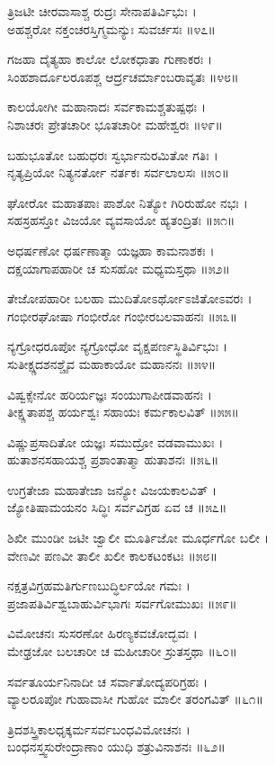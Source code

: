 ತ್ರಿಜಟೀ ಚೀರವಾಸಾಶ್ಚ ರುದ್ರಃ ಸೇನಾಪತಿರ್ವಿಭುಃ ।\\
ಅಹಶ್ಚರೋ ನಕ್ತಂಚರಸ್ತಿಗ್ಮಮನ್ಯುಃ ಸುವರ್ಚಸಃ ॥೪೭॥

ಗಜಹಾ ದೈತ್ಯಹಾ ಕಾಲೋ ಲೋಕಧಾತಾ ಗುಣಾಕರಃ ।\\
ಸಿಂಹಶಾರ್ದೂಲರೂಪಶ್ಚ ಆರ್ದ್ರಚರ್ಮಾಂಬರಾವೃತಃ ॥೪೮॥

ಕಾಲಯೋಗೀ ಮಹಾನಾದಃ ಸರ್ವಕಾಮಶ್ಚತುಷ್ಪಥಃ ।\\
ನಿಶಾಚರಃ ಪ್ರೇತಚಾರೀ ಭೂತಚಾರೀ ಮಹೇಶ್ವರಃ ॥೪೯॥

ಬಹುಭೂತೋ ಬಹುಧರಃ ಸ್ವರ್ಭಾನುರಮಿತೋ ಗತಿಃ ।\\
ನೃತ್ಯಪ್ರಿಯೋ ನಿತ್ಯನರ್ತೋ ನರ್ತಕಃ ಸರ್ವಲಾಲಸಃ ॥೫೦॥

ಘೋರೋ ಮಹಾತಪಾಃ ಪಾಶೋ ನಿತ್ಯೋ ಗಿರಿರುಹೋ ನಭಃ ।\\
ಸಹಸ್ರಹಸ್ತೋ ವಿಜಯೋ ವ್ಯವಸಾಯೋ ಹ್ಯತಂದ್ರಿತಃ ॥೫೧॥

ಅಧರ್ಷಣೋ ಧರ್ಷಣಾತ್ಮಾ ಯಜ್ಞಹಾ ಕಾಮನಾಶಕಃ ।\\
ದಕ್ಷಯಾಗಾಪಹಾರೀ ಚ ಸುಸಹೋ ಮಧ್ಯಮಸ್ತಥಾ ॥೫೨॥

ತೇಜೋಪಹಾರೀ ಬಲಹಾ ಮುದಿತೋಽರ್ಥೋಽಜಿತೋಽವರಃ ।\\
ಗಂಭೀರಘೋಷಾ ಗಂಭೀರೋ ಗಂಭೀರಬಲವಾಹನಃ ॥೫೩॥

ನ್ಯಗ್ರೋಧರೂಪೋ ನ್ಯಗ್ರೋಧೋ ವೃಕ್ಷಪರ್ಣಸ್ಥಿತಿರ್ವಿಭುಃ ।\\
ಸುತೀಕ್ಷ್ಣದಶನಶ್ಚೈವ ಮಹಾಕಾಯೋ ಮಹಾನನಃ ॥೫೪॥

ವಿಷ್ವಕ್ಸೇನೋ ಹರಿರ್ಯಜ್ಞಃ ಸಂಯುಗಾಪೀಡವಾಹನಃ ।\\
ತೀಕ್ಷ್ಣತಾಪಶ್ಚ ಹರ್ಯಶ್ವಃ ಸಹಾಯಃ ಕರ್ಮಕಾಲವಿತ್ ॥೫೫॥

ವಿಷ್ಣುಪ್ರಸಾದಿತೋ ಯಜ್ಞಃ ಸಮುದ್ರೋ ವಡವಾಮುಖಃ ।\\
ಹುತಾಶನಸಹಾಯಶ್ಚ ಪ್ರಶಾಂತಾತ್ಮಾ ಹುತಾಶನಃ ॥೫೬॥

ಉಗ್ರತೇಜಾ ಮಹಾತೇಜಾ ಜನ್ಯೋ ವಿಜಯಕಾಲವಿತ್ ।\\
ಜ್ಯೋತಿಷಾಮಯನಂ ಸಿದ್ಧಿಃ ಸರ್ವವಿಗ್ರಹ ಏವ ಚ ॥೫೭॥

ಶಿಖೀ ಮುಂಡೀ ಜಟೀ ಜ್ವಾಲೀ ಮೂರ್ತಿಜೋ ಮೂರ್ಧಗೋ ಬಲೀ ।\\
ವೇಣವೀ ಪಣವೀ ತಾಲೀ ಖಲೀ ಕಾಲಕಟಂಕಟಃ ॥೫೮॥

ನಕ್ಷತ್ರವಿಗ್ರಹಮತಿರ್ಗುಣಬುದ್ಧಿರ್ಲಯೋ ಗಮಃ ।\\
ಪ್ರಜಾಪತಿರ್ವಿಶ್ವಬಾಹುರ್ವಿಭಾಗಃ ಸರ್ವಗೋಮುಖಃ ॥೫೯॥

ವಿಮೋಚನಃ ಸುಸರಣೋ ಹಿರಣ್ಯಕವಚೋದ್ಭವಃ ।\\
ಮೇಢ್ರಜೋ ಬಲಚಾರೀ ಚ ಮಹೀಚಾರೀ ಸ್ರುತಸ್ತಥಾ ॥೬೦॥

ಸರ್ವತೂರ್ಯನಿನಾದೀ ಚ ಸರ್ವಾತೋದ್ಯಪರಿಗ್ರಹಃ ।\\
ವ್ಯಾಲರೂಪೋ ಗುಹಾವಾಸೀ ಗುಹೋ ಮಾಲೀ ತರಂಗವಿತ್ ॥೬೧॥

ತ್ರಿದಶಸ್ತ್ರಿಕಾಲಧೃಕ್ಕರ್ಮಸರ್ವಬಂಧವಿಮೋಚನಃ ।\\
ಬಂಧನಸ್ತ್ವಸುರೇಂದ್ರಾಣಾಂ ಯುಧಿ ಶತ್ರುವಿನಾಶನಃ ॥೬೨॥

